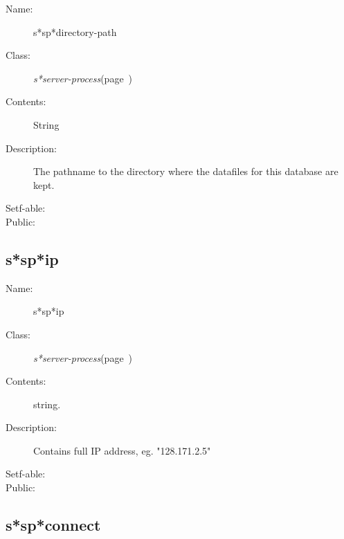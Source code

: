 \begin{description}

\item [Name:]  s*sp*directory-path

\item [Class:] {\sl s*server-process}\hfill(page~\pageref{s*server-process})

\item [Contents:] String

\item [Description:]
The pathname to the directory where the datafiles for 
this database are kept.

\item [Setf-able:]


\item [Public:]



\end{description}
\horizontalline

\subsection{s*sp*ip}
\label{s*sp*ip}

\begin{description}
\item [Name:]  s*sp*ip

\item [Class:]
{\sl s*server-process}\hfill(page~\pageref{s*server-process})

\item [Contents:] string.

\item [Description:]
Contains full IP address, eg. "128.171.2.5"

\item [Setf-able:]

\item [Public:]



\end{description}
\horizontalline

\subsection{s*sp*connect}
\label{s*sp*connect}

